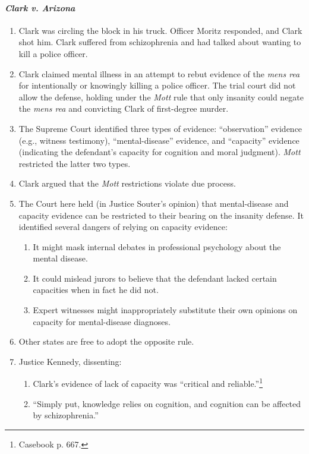 \paragraph{\emph{Clark v. Arizona}}

\begin{enumerate}
    \item Clark was circling the block in his truck. Officer Moritz responded, and Clark shot him. Clark suffered from schizophrenia and had talked about wanting to kill a police officer.
    \item Clark claimed mental illness in an attempt to rebut evidence of the \emph{mens rea} for intentionally or knowingly killing a police officer. The trial court did not allow the defense, holding under the \emph{Mott} rule that only insanity could negate the \emph{mens rea} and convicting Clark of first-degree murder.
    \item The Supreme Court identified three types of evidence: ``observation'' evidence (e.g., witness testimony), ``mental-disease'' evidence, and ``capacity'' evidence (indicating the defendant's capacity for cognition and moral judgment). \emph{Mott} restricted the latter two types.
    \item Clark argued that the \emph{Mott} restrictions violate due process.
    \item The Court here held (in Justice Souter's opinion) that mental-disease and capacity evidence can be restricted to their bearing on the insanity defense. It identified several dangers of relying on capacity evidence:
    \begin{enumerate}
        \item It might mask internal debates in professional psychology about the mental disease.
        \item It could mislead jurors to believe that the defendant lacked certain capacities when in fact he did not.
        \item Expert witnesses might inappropriately substitute their own opinions on capacity for mental-disease diagnoses.
    \end{enumerate}
    \item Other states are free to adopt the opposite rule.
    \item Justice Kennedy, dissenting:
    \begin{enumerate}
        \item Clark's evidence of lack of capacity was ``critical and reliable.''\footnote{Casebook p. 667.}
        \item ``Simply put, knowledge relies on cognition, and cognition can be affected by schizophrenia.''

\end{enumerate}
\end{enumerate}
